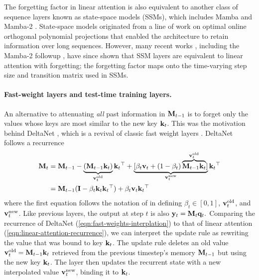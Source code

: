 \documentclass[notitlepage, 11pt]{article}
\begin{document}
The forgetting factor in linear attention is also equivalent to another class of sequence layers known as state-space models (SSMs), which includes Mamba \citep{Gu2024MambaLinearTimeSequence} and Mamba-2 \citep{Dao2024TransformersAreSSMs}.
State-space models originated from a line of work on optimal online orthogonal polynomial projections \citep{Gu2020HiPPORecurrentMemory,Gu2021EfficientlyModelingLong,Gu2022ParameterizationInitializationDiagonal} that enabled the architecture to retain information over long sequences.
However, many recent works \citep{Han2024DemystifyMambaVision,Trockman2024MimeticInitializationHelps,Ren2024CanMambaAlways}, including the Mamba-2 followup \citep{Dao2024TransformersAreSSMs}, have since shown that SSM layers are equivalent to linear attention with forgetting; the forgetting factor maps onto the time-varying step size and transition matrix used in SSMs.

\paragraph{Fast-weight layers and test-time training layers.}
An alternative to attenuating \emph{all} past information in $\mathbf{M}_{t-1}$ is to forget only the values whose keys are most similar to the new key $\mathbf{k}_t$.
This was the motivation behind DeltaNet \citep{Schlag2021LinearTransformersAre}, which is a revival of classic fast weight layers \citep{Schmidhuber1992LearningControlFastWeight}.
DeltaNet follows a recurrence
\begin{align}
    \mathbf{M}_{t} &= \mathbf{M}_{t-1} - \underbrace{(\mathbf{M}_{t-1}\mathbf{k}_t)}_{\mathbf{v}_{t}^{\text{old}}}\mathbf{k}_t{}^\top + \underbrace{[\beta_t \mathbf{v}_t + (1-\beta_t) \overbrace{\mathbf{M}_{t-1}\mathbf{k}_t}^{\mathbf{v}_t^{\text{old}}}]}_{\mathbf{v}_t^{\text{new}}}\mathbf{k}_t{}^\top \label{eqn:fast-weights-interplation} \\
    &= \mathbf{M}_{t-1}(\mathbf{I} - \beta_t \mathbf{k}_t\mathbf{k}_t{}^\top) + \beta_t \mathbf{v}_t\mathbf{k}_t{}^\top \label{eqn:delta-rule}
\end{align}
where the first equation follows the notation of \citet{Schlag2021LinearTransformersAre} in defining $\beta_t\in [0, 1]$, $\mathbf{v}_t^{\text{old}}$, and $\mathbf{v}_t^{\text{new}}$.
Like previous layers, the output at step $t$ is also $\mathbf{y}_t = \mathbf{M}_t \mathbf{q}_t.$
Comparing the recurrence of DeltaNet (\autoref{eqn:fast-weights-interplation}) to that of linear attention (\autoref{eqn:linear-attention-recurrence}), we can interpret the update rule as rewriting the value that was bound to key $\mathbf{k}_t$. 
The update rule deletes an old value $\mathbf{v}_t^{\text{old}}=\mathbf{M}_{t-1}\mathbf{k}_t$ retrieved from the previous timestep's memory $\mathbf{M}_{t-1}$ but using the new key $\mathbf{k}_t$.
The layer then updates the recurrent state with a new interpolated value $\mathbf{v}_t^{\text{new}}$, binding it to $\mathbf{k}_t$.
\end{document}
